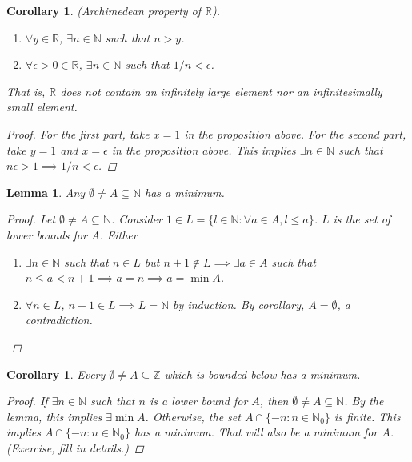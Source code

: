 \documentclass[10pt]{article}
\newcommand{\N}{\mathbb{N}}
\newcommand{\Z}{\mathbb{Z}}
\newcommand{\R}{\mathbb{R}}
\newtheorem{corollary}[theorem]{Corollary}
\newtheorem{lemma}[theorem]{Lemma}
\theoremstyle{definition}
\theoremstyle{remark}
\begin{document}
\begin{corollary}
    (Archimedean property of $\R$).
    \begin{enumerate}
        \item $\forall y \in \R$, $\exists n \in \N$ such that $n > y$.
        \item $\forall \epsilon > 0 \in \R$, $\exists n \in \N$ such that $1/n < \epsilon$.
    \end{enumerate}
    That is, $\R$ does not contain an infinitely large element nor an infinitesimally small element.
    \begin{proof}
        For the first part, take $x = 1$ in the proposition above.
        For the second part, take $y = 1$ and $x = \epsilon$ in the proposition above.
        This implies $\exists n \in \N$ such that $n \epsilon > 1 \implies 1/n < \epsilon$.
    \end{proof}
\end{corollary}

\begin{lemma}
    Any $\emptyset \neq A \subseteq \N$ has a minimum.
    \begin{proof}
        Let $\emptyset \neq A \subseteq \N$. Consider $1 \in L = \{l \in \N : \forall a \in A, l \leq a\}$.
        $L$ is the set of lower bounds for $A$. Either
        \begin{enumerate}
            \item $\exists n \in \N$ such that $n \in L$ but $n + 1\not\in L \implies \exists a \in A$ such that $n \leq a < n + 1 \implies a = n \implies a = \min A$.
            \item $\forall n \in L$, $n + 1 \in L \implies L = \N$ by induction. By corollary, $A = \emptyset$, a contradiction.
        \end{enumerate}
    \end{proof}
\end{lemma}

\begin{corollary}
    Every $\emptyset \neq A \subseteq \Z$ which is bounded below has a minimum.
    \begin{proof}
        If $\exists n \in \N$ such that $n$ is a lower bound for $A$, then $\emptyset \neq A \subseteq \N$. By the lemma, this implies $\exists \min A$.
        Otherwise, the set $A \cap \{-n \colon n \in \N_0\}$ is finite.
        This implies $A \cap \{-n \colon n \in \N_0\}$ has a minimum. That will also be a minimum for $A$. (Exercise, fill in details.)
    \end{proof}
\end{corollary}
\end{document}
